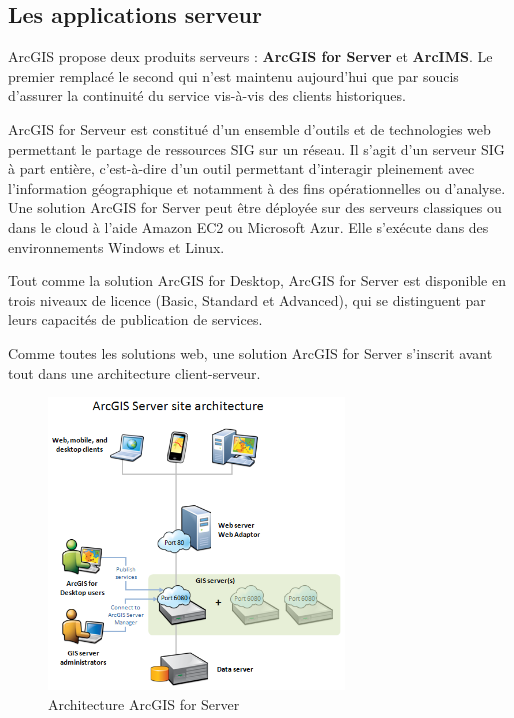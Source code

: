 \documentclass[11pt]{article}
\begin{document}
\subsection{Les applications serveur}
ArcGIS propose deux produits serveurs : \textbf{ArcGIS for Server} et \textbf{ArcIMS}. Le premier remplacé le second qui n’est maintenu aujourd’hui que par soucis d’assurer la continuité du service vis-à-vis des clients historiques. 

ArcGIS for Serveur est constitué d’un ensemble d’outils et de technologies web permettant le partage de ressources SIG sur un réseau. Il s’agit d’un serveur SIG à part entière, c’est-à-dire d’un outil permettant d’interagir pleinement avec l’information géographique et notamment à des fins opérationnelles ou d’analyse. Une solution ArcGIS for Server peut être déployée sur des serveurs classiques ou dans le cloud à l'aide Amazon EC2 ou Microsoft Azur. Elle s'exécute dans des environnements Windows et Linux.

Tout comme la solution ArcGIS for Desktop, ArcGIS for Server est disponible en trois niveaux de licence (Basic, Standard et Advanced), qui se distinguent par leurs capacités de publication de services. 

Comme toutes les solutions web, une solution ArcGIS for Server s’inscrit avant tout dans une architecture client-serveur. 
\begin{figure}[H]
	\center \includegraphics[width=0.7\textwidth]{img/cours/AcrGIS_Server_architecture.png}
	\caption{Architecture ArcGIS for Server}
\end{figure}
\vspace{2em}
\end{document}
